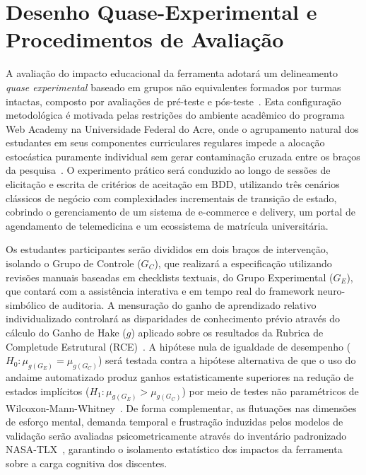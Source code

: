 \documentclass[ruledheader]{abnt_UFF}[abntex2]
\begin{document}
\section{Desenho Quase-Experimental e Procedimentos de Avaliação}

A avaliação do impacto educacional da ferramenta adotará um delineamento \textit{quase experimental} baseado em grupos não equivalentes formados por turmas intactas, composto por avaliações de pré-teste e pós-teste~\cite{campbell1963experimental}. Esta configuração metodológica é motivada pelas restrições do ambiente acadêmico do programa Web Academy na Universidade Federal do Acre, onde o agrupamento natural dos estudantes em seus componentes curriculares regulares impede a alocação estocástica puramente individual sem gerar contaminação cruzada entre os braços da pesquisa~\cite{kitchenham2022principles}. O experimento prático será conduzido ao longo de sessões de elicitação e escrita de critérios de aceitação em BDD, utilizando três cenários clássicos de negócio com complexidades incrementais de transição de estado, cobrindo o gerenciamento de um sistema de e-commerce e delivery, um portal de agendamento de telemedicina e um ecossistema de matrícula universitária.

Os estudantes participantes serão divididos em dois braços de intervenção, isolando o Grupo de Controle ($G_C$), que realizará a especificação utilizando revisões manuais baseadas em checklists textuais, do Grupo Experimental ($G_E$), que contará com a assistência interativa e em tempo real do framework neuro-simbólico de auditoria. A mensuração do ganho de aprendizado relativo individualizado controlará as disparidades de conhecimento prévio através do cálculo do Ganho de Hake ($g$) aplicado sobre os resultados da Rubrica de Completude Estrutural (RCE)~\cite{hake1998interactive}. A hipótese nula de igualdade de desempenho ($H_0: \mu_{g(G_E)} = \mu_{g(G_C)}$) será testada contra a hipótese alternativa de que o uso do andaime automatizado produz ganhos estatisticamente superiores na redução de estados implícitos ($H_1: \mu_{g(G_E)} > \mu_{g(G_C)}$) por meio de testes não paramétricos de Wilcoxon-Mann-Whitney~\cite{kitchenham2022principles}. De forma complementar, as flutuações nas dimensões de esforço mental, demanda temporal e frustração induzidas pelos modelos de validação serão avaliadas psicometricamente através do inventário padronizado NASA-TLX~\cite{hart1988development}, garantindo o isolamento estatístico dos impactos da ferramenta sobre a carga cognitiva dos discentes.
\end{document}
